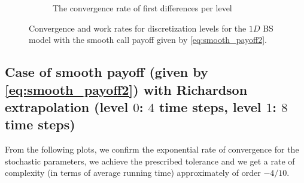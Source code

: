 \documentclass[11pt]{article}
\begin{document}
\begin{figure}[!h]
\begin{subfigure}{.5\textwidth}
		\caption{ The convergence rate of first differences per level}
		\label{fig:misc_1D_BS_8_steps_smooth_second_payoff_eps_10_5_sub4}
	\end{subfigure}%
	\caption{Convergence and work rates for discretization levels for the $1D$ BS model with the smooth call payoff given by \eqref{eq:smooth_payoff2}.}
	\label{fig:misc_1D_BS_8_steps_smooth_second_payoff_eps_10_5_2}
\end{figure}


\newpage


\subsection{Case of smooth payoff (given by \eqref{eq:smooth_payoff2}) with Richardson extrapolation (level $0$: $4$ time steps, level $1$: $8$ time steps)}
From the following plots, we confirm the exponential rate of convergence for the stochastic parameters, we achieve the prescribed tolerance and  we get a rate of complexity (in terms of average running time) approximately of order $-4/10$.
\end{document}
